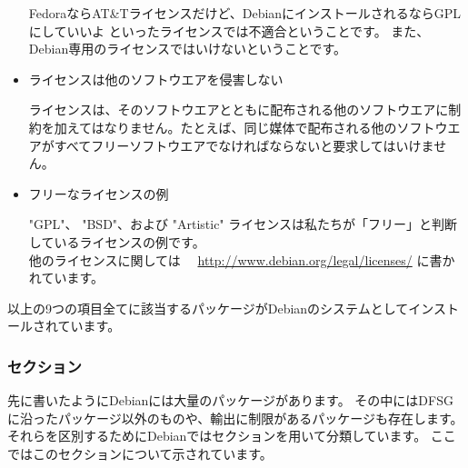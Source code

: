 \documentclass[mingoth,a4paper]{jsarticle}
\begin{document}
\begin{itemize}
FedoraならAT\&Tライセンスだけど、DebianにインストールされるならGPLにしていいよ  といったライセンスでは不適合ということです。
また、Debian専用のライセンスではいけないということです。
	  
 \item ライセンスは他のソフトウエアを侵害しない

ライセンスは、そのソフトウエアとともに配布される他のソフトウエアに制約を加えてはなりません。たとえば、同じ媒体で配布される他のソフトウエアがすべてフリーソフトウエアでなければならないと要求してはいけません。


 \item フリーなライセンスの例

"GPL"、 "BSD"、および "Artistic" ライセンスは私たちが「フリー」と判断しているライセンスの例です。
\\

他のライセンスに関しては　	
\url{http://www.debian.org/legal/licenses/}
に書かれています。

\end{itemize}
以上の9つの項目全てに該当するパッケージがDebianのシステムとしてインストールされています。
	
\subsubsection{セクション}
	先に書いたようにDebianには大量のパッケージがあります。
	その中にはDFSGに沿ったパッケージ以外のものや、輸出に制限があるパッケージも存在します。
	それらを区別するためにDebianではセクションを用いて分類しています。
	ここではこのセクションについて示されています。
\end{document}
